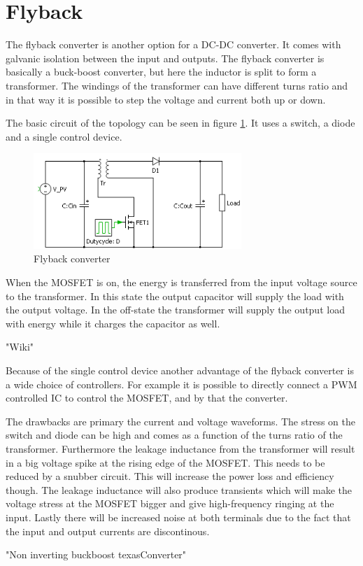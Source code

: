 \section{Flyback}

The flyback converter is another option for a DC-DC converter. It comes with galvanic isolation between the input and outputs. The flyback converter is basically a buck-boost converter, but here the inductor is split to form a transformer. The windings of the transformer can have different turns ratio and in that way it is possible to step the voltage and current both up or down. 

The basic circuit of the topology can be seen in figure \ref{Flyback_SCHEMATIC}. It uses a switch, a diode and a single control device.    

\begin{figure}[htbp]
	\begin{center}
	\includegraphics[width=0.7\textwidth]{../Pictures/flyback_schem.png}
	\caption{Flyback converter}
	\label{Flyback_SCHEMATIC}
	\end{center}
\end{figure}

When the MOSFET is on, the energy is transferred from the input voltage source to the transformer. In this state the output capacitor will supply the load with the output voltage. In the off-state the transformer will supply the output load with energy while it charges the capacitor as well.

"Wiki" 

Because of the single control device another advantage of the flyback converter is a wide choice of controllers. For example it is possible to directly connect a PWM controlled IC to control the MOSFET, and by that the converter. 

The drawbacks are primary the current and voltage waveforms. The stress on the switch and diode can be high and comes as a function of the turns ratio of the transformer. Furthermore the leakage inductance from the transformer will result in a big voltage spike at the rising edge of the MOSFET. This needs to be reduced by a snubber circuit. This will increase the power loss and efficiency though. The leakage inductance will also produce transients which will make the voltage stress at the MOSFET bigger and give high-frequency ringing at the input. Lastly there will be increased noise at both terminals due to the fact that the input and output currents are discontinous. 

"Non inverting buckboost texasConverter"
